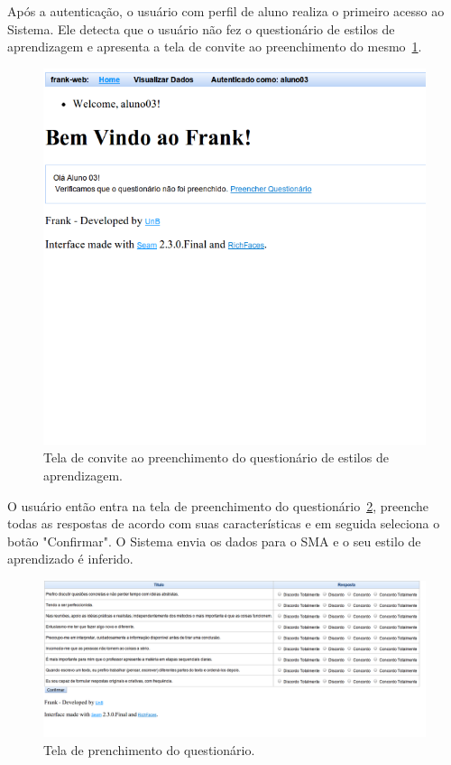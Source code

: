 Após a autenticação, o usuário com perfil de aluno realiza o primeiro acesso ao Sistema. Ele detecta que o usuário não fez o questionário de estilos de aprendizagem e apresenta a tela de convite ao preenchimento do mesmo~\ref{fig:frank-tela-aluno-prim-acesso}.

\begin{figure}
	\centering
	\includegraphics[scale=0.6]{images/frank-tela-aluno-prim-acesso.png}
	\caption{Tela de convite ao preenchimento do questionário de estilos de aprendizagem.}
	\label{fig:frank-tela-aluno-prim-acesso}
\end{figure}

O usuário então entra na tela de preenchimento do questionário~\ref{fig:frank-tela-aluno-preencher-questionario}, preenche todas as respostas de acordo com suas características e em seguida seleciona o botão "Confirmar". O Sistema envia os dados para o SMA e o seu estilo de aprendizado é inferido.

\begin{figure}
	\centering
	\includegraphics[scale=0.48]{images/frank-tela-aluno-preencher-questionario.png}
	\caption{Tela de prenchimento do questionário.}
	\label{fig:frank-tela-aluno-preencher-questionario}
\end{figure}

